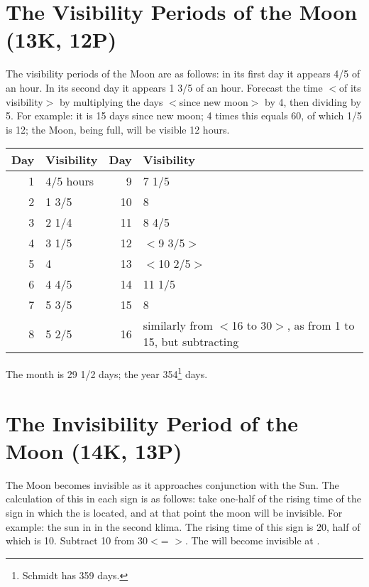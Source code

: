 \section{The Visibility Periods of the Moon (13K, 12P)}

The visibility periods of the Moon are as follows: in its first day it appears 4/5 of an hour. In its second day it appears 1 3/5 of an hour. Forecast the time $<$of its visibility$>$ by multiplying the days $<$since new moon$>$ by 4, then dividing by 5. For example: it is 15 days since new moon; 4 times this equals 60, of which 1/5 is 12; the Moon, being full, will be visible 12 hours.

\begin{table}[ht]
\begin{center}
\begin{tabularx}{\textwidth}	{| r | l | r | X |}
\hline
Day & Visibility & Day & Visibility \\
\hline
1	& 4/5 hours	& 9		& 7 1/5	\\
2	& 1 3/5	  	& 10	& 8			\\	
3	& 2 1/4		& 11	& 8 4/5	\\
4	& 3 1/5		& 12	& $<$9 3/5$>$	\\
5	& 4				& 13	& $<$10 2/5$>$ \\
6	& 4 4/5		& 14	& 11 1/5	\\
7	& 5 3/5		& 15 	& 8			\\
8	& 5 2/5		& 16	& similarly from $<$16 to 30$>$, as
							  from 1 to 15, but subtracting \\				\hline
\end{tabularx}
\end{center}
\end{table}

The month is 29 1/2 days; the year 354\footnote{Schmidt has 359 days.} days.

\newpage
\section{The Invisibility Period of the Moon (14K, 13P)}

The Moon becomes invisible as it approaches conjunction with the Sun. The calculation of this in each sign is as follows: take one-half of the rising time of the sign in which the \Sun\xspace is located, and at that point the moon will be invisible. For example: the sun in \Aries\xspace in the second klima. The rising time of this sign is 20, half of which is 10. Subtract 10 from 30\deg\xspace $<$\Aries\xspace 1\deg\xspace = \Pisces\xspace 30\deg$>$. The \Moon\xspace will become invisible at \Pisces\xspace 20\deg.

